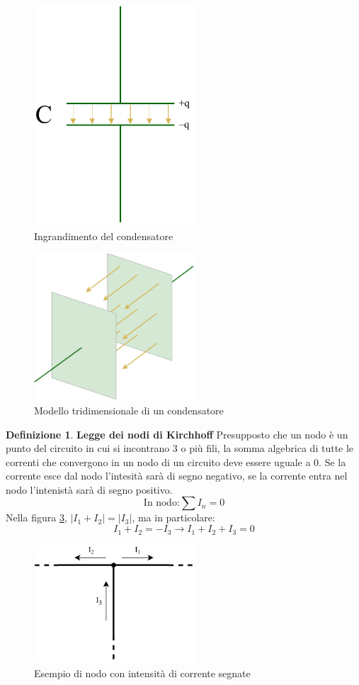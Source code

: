 \documentclass[a3paper, twoside, openany]{book}
\theoremstyle{definition}
\newtheorem{definition}{Definizione}
\begin{document}
\begin{figure}[htp]
    \centering
    \includegraphics[width=6cm]{Circuito RC-Condensatore-zoom}
    \caption{Ingrandimento del condensatore}
    \label{fig:condensatore-z}
\end{figure}
\begin{figure}[htp]
    \centering
    \includegraphics[width=6cm]{Circuito RC-Condensatore-3D}
    \caption{Modello tridimensionale di un condensatore}
    \label{fig:condensatore-3d}
\end{figure}
\begin{definition}{\textbf{Legge dei nodi di Kirchhoff}}
Presupposto che un nodo è un punto del circuito in cui si incontrano 3 o più fili, la somma algebrica di tutte le correnti che convergono in un nodo di un circuito deve essere uguale a 0. Se la corrente esce dal nodo l'intesità sarà di segno negativo, se la corrente entra nel nodo l'intenistà sarà di segno positivo. $$\text{In nodo:}\sum{I_n}=0$$ Nella figura \ref{fig:nodo}, $|I_1+I_2|=|I_3|$, ma in particolare: $$I_1+I_2=-I_3\longrightarrow I_1+I_2+I_3=0$$
\end{definition}
\begin{figure}[htp]
    \centering
    \includegraphics[width=6cm]{Circuito RC-Nodo}
    \caption{Esempio di nodo con intensità di corrente segnate}
    \label{fig:nodo}
\end{figure}
\end{document}

